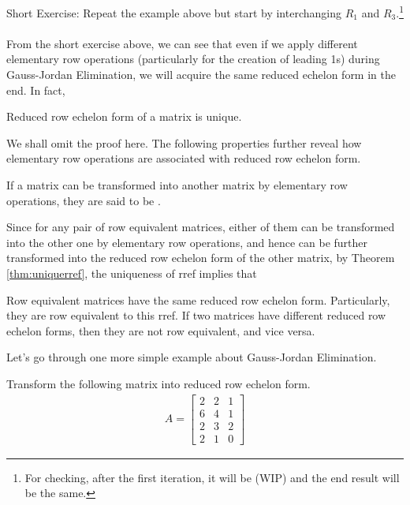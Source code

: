 Short Exercise: Repeat the example above but start by interchanging $R_1$ and $R_3$.\footnote{For checking, after the first iteration, it will be
(WIP)
and the end result will be the same.}\\
\\
From the short exercise above, we can see that even if we apply different elementary row operations (particularly for the creation of leading 1s) during Gauss-Jordan Elimination, we will acquire the same reduced echelon form in the end. In fact,
\begin{thm}
\label{thm:uniquerref}
Reduced row echelon form of a matrix is unique.
\end{thm}
We shall omit the proof here. The following properties further reveal how elementary row operations are associated with reduced row echelon form.
\begin{proper}
\label{proper:rowequiv}
If a matrix can be transformed into another matrix by elementary row operations, they are said to be .
\end{proper}
Since for any pair of row equivalent matrices, either of them can be transformed into the other one by elementary row operations, and hence can be further transformed into the reduced row echelon form of the other matrix, by Theorem \ref{thm:uniquerref}, the uniqueness of rref implies that
\begin{proper}
\label{proper:rowequivreduce}
Row equivalent matrices have the same reduced row echelon form. Particularly, they are row equivalent to this rref. If two matrices have different reduced row echelon forms, then they are not row equivalent, and vice versa.
\end{proper}
Let's go through one more simple example about Gauss-Jordan Elimination.
\begin{exmp}
\label{exmp:rref2}
Transform the following matrix into reduced row echelon form.
\begin{align*}
A =
\begin{bmatrix}
2 & 2 & 1 \\
6 & 4 & 1 \\
2 & 3 & 2 \\
2 & 1 & 0
\end{bmatrix}    
\end{align*}
\end{exmp}
